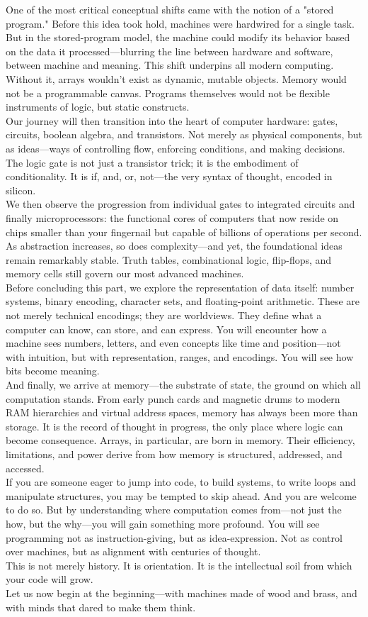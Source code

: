 \documentclass[12pt, oneside]{book}
\begin{document}
	One of the most critical conceptual shifts came with the notion of a "stored program." Before this idea took hold, machines were hardwired for a single task. But in the stored-program model, the machine could modify its behavior based on the data it processed—blurring the line between hardware and software, between machine and meaning. This shift underpins all modern computing. Without it, arrays wouldn't exist as dynamic, mutable objects. Memory would not be a programmable canvas. Programs themselves would not be flexible instruments of logic, but static constructs.\\
	Our journey will then transition into the heart of computer hardware: gates, circuits, boolean algebra, and transistors. Not merely as physical components, but as ideas—ways of controlling flow, enforcing conditions, and making decisions. The logic gate is not just a transistor trick; it is the embodiment of conditionality. It is if, and, or, not—the very syntax of thought, encoded in silicon.\\
	We then observe the progression from individual gates to integrated circuits and finally microprocessors: the functional cores of computers that now reside on chips smaller than your fingernail but capable of billions of operations per second. As abstraction increases, so does complexity—and yet, the foundational ideas remain remarkably stable. Truth tables, combinational logic, flip-flops, and memory cells still govern our most advanced machines.\\
	Before concluding this part, we explore the representation of data itself: number systems, binary encoding, character sets, and floating-point arithmetic. These are not merely technical encodings; they are worldviews. They define what a computer can know, can store, and can express. You will encounter how a machine sees numbers, letters, and even concepts like time and position—not with intuition, but with representation, ranges, and encodings. You will see how bits become meaning.\\
	And finally, we arrive at memory—the substrate of state, the ground on which all computation stands. From early punch cards and magnetic drums to modern RAM hierarchies and virtual address spaces, memory has always been more than storage. It is the record of thought in progress, the only place where logic can become consequence. Arrays, in particular, are born in memory. Their efficiency, limitations, and power derive from how memory is structured, addressed, and accessed.\\
	If you are someone eager to jump into code, to build systems, to write loops and manipulate structures, you may be tempted to skip ahead. And you are welcome to do so. But by understanding where computation comes from—not just the how, but the why—you will gain something more profound. You will see programming not as instruction-giving, but as idea-expression. Not as control over machines, but as alignment with centuries of thought.\\
	This is not merely history. It is orientation. It is the intellectual soil from which your code will grow.\\
	Let us now begin at the beginning—with machines made of wood and brass, and with minds that dared to make them think.
\end{document}
